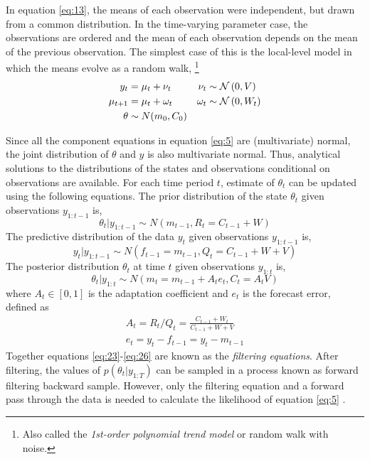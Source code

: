 \documentclass{article}
\begin{document}
In equation \ref{eq:13}, the means of each observation were independent, but drawn from a common distribution.
In the time-varying parameter case, the observations are ordered and the mean of each observation depends on the mean of the previous observation.
The simplest case of this is the local-level model in which the means evolve as a random walk,
\footnote{Also called the \textit{1st-order polynomial trend model} \parencite[Chapter 2]{WestHarrison1997} or random walk with noise.}
\begin{equation}
  \label{eq:5}
  \begin{aligned}[t]
    y_{t} &= \mu_{t} + \nu_{t} & \nu_{t} & \sim \mathcal{N}\left(0, V\right) \\
    \mu_{t + 1} &= \mu_{t} + \omega_{t} & \omega_{t} & \sim \mathcal{N}\left(0, W_{t}\right) \\
    \theta & \sim N(m_{0}, C_{0})
  \end{aligned}
\end{equation}

Since all the component equations in equation \eqref{eq:5} are (multivariate) normal, the joint distribution of $\theta$ and $y$ is also multivariate normal.
Thus, analytical solutions to the distributions of the states and observations conditional on observations are available.
For each time period $t$, estimate of $\theta_{t}$ can be updated using the following equations.
The prior distribution of the state $\theta_{t}$ given observations $y_{1:t-1}$ is,
\begin{equation}
  \label{eq:23}
  \theta_{t} | y_{1:t-1}  \sim N(m_{t-1}, R_{t} = C_{t - 1} + W)
\end{equation}
The predictive distribution of the data $y_{t}$ given observations $y_{1:t-1}$ is,
\begin{equation}
  \label{eq:25}
  y_{t} | y_{1:t-1}  \sim N(f_{t-1} = m_{t-1}, Q_{t} = C_{t - 1} + W + V)
\end{equation}
The posterior distribution $\theta_{t}$ at time $t$ given observations $y_{1:t}$ is,
\begin{equation}
  \label{eq:26}
  \theta_{t} | y_{1:t} \sim N(m_{t} = m_{t-1} + A_{t} e_{t}, C_{t} = A_{t} V)
\end{equation}
where $A_{t} \in [0, 1]$ is the adaptation coefficient and $e_{t}$ is the forecast error, defined as
\begin{align}
  \label{eq:30}
  A_{t} = R_{t} / Q_{t} = \frac{C_{t-1} + W_{t}}{C_{t-1} + W + V} \\
  e_{t} = y_{t} - f_{t-1} = y_{t} - m_{t-1}
\end{align}
Together equations \eqref{eq:23}-\eqref{eq:26} are known as the \textit{filtering equations}.
After filtering, the values of $p(\theta_{t} | y_{1:T})$ can be sampled in a process known as forward filtering backward sample.
However, only the filtering equation and a forward pass through the data is needed to calculate the likelihood of equation \eqref{eq:5}
.
\end{document}
